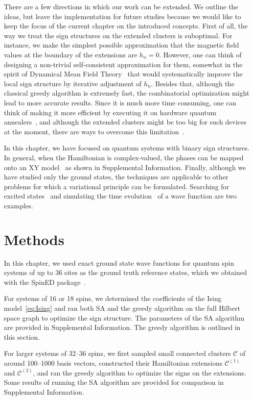 There are a few directions in which our work can be extended. We outline the ideas, but leave the implementation for future studies because we would like to keep the focus of the current chapter on the introduced concepts. First of all, the way we treat the sign structures on the extended clusters is suboptimal. For instance, we make the simplest possible approximation that the magnetic field values at the boundary of the extensions are $h_n=0$. However, one can think of designing a non-trivial self-consistent approximation for them, somewhat in the spirit of Dynamical Mean Field Theory~\cite{DMFT} that would systematically improve the local sign structure by iterative adjustment of $h_n$. Besides that, although the classical greedy algorithm is extremely fast, the combinatorial optimization might lead to more accurate results. Since it is much more time consuming, one can think of making it more efficient by executing it on hardware quantum annealers~\cite{QA}, and although the extended clusters might be too big for such devices at the moment, there are ways to overcome this limitation~\cite{raymond2022hybrid,okada2019improving}.

In this chapter, we have focused on quantum systems with binary sign structures. In general, when the Hamiltonian is complex-valued, the phases can be mapped onto an XY model~\cite{XY_model} as shown in Supplemental Information. Finally, although we have studied only the ground states, the techniques are applicable to other problems for which a variational principle can be formulated. Searching for excited states~\cite{excited} and simulating the time evolution~\cite{TDVP} of a wave function are two examples.

\section{Methods}

In this chapter, we used exact ground state wave functions for quantum spin systems of up to 36 sites as the ground truth reference states, which we obtained with the SpinED package~\cite{SpinED}.

For systems of 16 or 18 spins, we determined the coefficients of the Ising model~\eqref{eq:Ising} and ran both SA and the greedy algorithm on the full Hilbert space graph to optimize the sign structure.
The parameters of the SA algorithm are provided in Supplemental Information.
The greedy algorithm is outlined in this section.

For larger systems of 32--36 spins, we first sampled small connected clusters $\mathcal{C}$ of around 100--1000 basis vectors, constructed their Hamiltonian extensions $\mathcal{C}^{(1)}$ and $\mathcal{C}^{(2)}$, and ran the greedy algorithm to optimize the signs on the extensions.
Some results of running the SA algorithm are provided for comparison in Supplemental Information.

